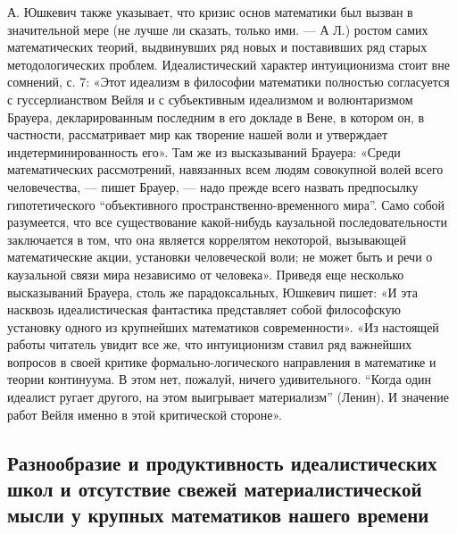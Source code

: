А. Юшкевич также указывает, что кризис основ математики был вызван в
значительной мере (не лучше ли сказать, только ими. --- А Л.) ростом
самих математических теорий, выдвинувших ряд новых и поставивших ряд
старых методологических проблем. Идеалистический характер
интуиционизма стоит вне сомнений, с. 7: «Этот идеализм в философии
математики полностью согласуется с гуссерлианством Вейля и с
субъективным идеализмом и волюнтаризмом Брауера, декларированным
последним в его докладе в Вене, в котором он, в частности,
рассматривает мир как творение нашей воли и утверждает
индетерминированность его». Там же из высказываний Брауера: «Среди
математических рассмотрений, навязанных всем людям совокупной волей
всего человечества, --- пишет Брауер, --- надо прежде всего назвать
предпосылку гипотетического ``объективного пространственно-временного
мира''. Само собой разумеется, что все существование какой-нибудь
каузальной последовательности заключается в том, что она является
коррелятом некоторой, вызывающей математические акции, установки
человеческой воли; не может быть и речи о каузальной связи мира
независимо от человека». Приведя еще несколько высказываний Брауера,
столь же парадоксальных, Юшкевич пишет: «И эта насквозь
идеалистическая фантастика представляет собой философскую установку
одного из крупнейших математиков современности». «Из настоящей работы
читатель увидит все же, что интуиционизм ставил ряд важнейших вопросов
в своей критике формально-логического направления в математике и
теории континуума. В этом нет, пожалуй, ничего удивительного. ``Когда
один идеалист ругает другого, на этом выигрывает материализм''
(Ленин). И значение работ Вейля именно в этой критической стороне».

\subsection{Разнообразие и продуктивность идеалистических школ и
отсутствие свежей материалистической мысли у крупных математиков
нашего времени}


